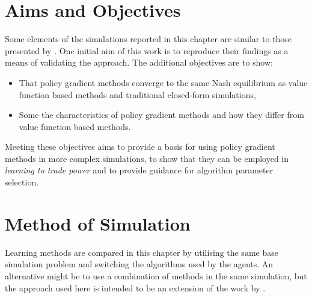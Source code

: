 \section{Aims and Objectives}
Some elements of the simulations reported in this chapter are similar to those
presented by .  One initial aim of this work is to
reproduce their findings as a means of validating the approach.  The additional
objectives are to show:
\begin{itemize}
  \item That policy gradient methods converge to the same Nash equilibrium as
  value function based methods and traditional closed-form simulations,
  \item Some the characteristics of policy gradient methods and how they differ
  from value function based methods.
\end{itemize}
Meeting these objectives aims to provide a basis for using policy gradient
methods in more complex simulations, to show that they can be employed in
\textit{learning to trade power} and to provide guidance for algorithm parameter
selection.

\section{Method of Simulation}
Learning methods are compared in this chapter by utilising the same base
simulation problem and switching the algorithms used by the agents.  An
alternative might be to use a combination of methods in the same simulation, but the
approach used here is intended to be an extension of the work by
.

